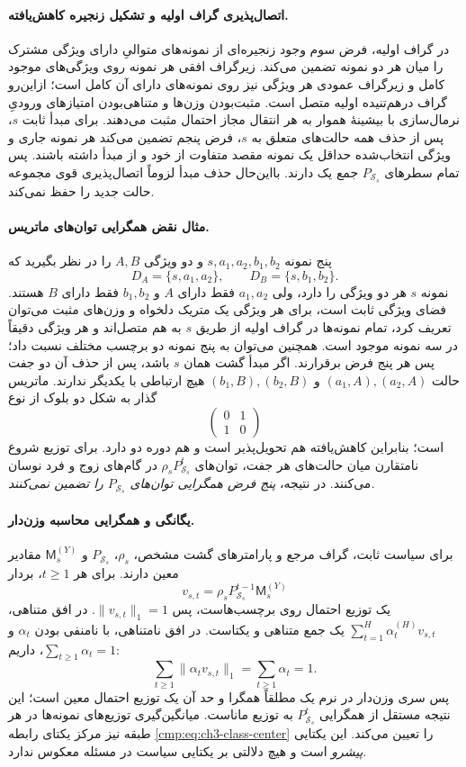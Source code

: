 \paragraph{اتصال‌پذیری گراف اولیه و تشکیل زنجیره کاهش‌یافته.}
در گراف اولیه، فرض سوم
وجود زنجیره‌ای از نمونه‌های
متوالیِ دارای ویژگی مشترک
را میان هر دو نمونه
تضمین می‌کند. زیرگراف
افقی هر نمونه روی
ویژگی‌های موجود کامل
و زیرگراف عمودی هر
ویژگی نیز روی
نمونه‌های دارای آن
کامل است؛ ازاین‌رو
گراف درهم‌تنیده اولیه
متصل است. مثبت‌بودن
وزن‌ها و متناهی‌بودن امتیازهای ورودیِ نرمال‌سازی با بیشینهٔ هموار
به هر انتقال مجاز
احتمال مثبت می‌دهند.
برای مبدأ ثابت $s$،
پس از حذف همه حالت‌های
متعلق به $s$،
فرض پنجم تضمین می‌کند
هر نمونه جاری و
ویژگی انتخاب‌شده
حداقل یک نمونه مقصد
متفاوت از خود و
از مبدأ داشته باشند.
پس تمام سطرهای
$P_{\mathcal S_s}$ جمع یک دارند.
بااین‌حال حذف مبدأ
لزوماً اتصال‌پذیری
قوی مجموعه حالت
جدید را حفظ نمی‌کند.

\paragraph{مثال نقض همگرایی توان‌های ماتریس.}
پنج نمونه $s,a_1,a_2,b_1,b_2$
و دو ویژگی $A,B$
را در نظر بگیرید که
\[
D_A=\{s,a_1,a_2\},
\qquad
D_B=\{s,b_1,b_2\}.
\]
نمونه $s$ هر دو ویژگی
را دارد، ولی $a_1,a_2$
فقط دارای $A$ و
$b_1,b_2$ فقط دارای
$B$ هستند. فضای
ویژگی ثابت است،
برای هر ویژگی
یک متریک دلخواه
و وزن‌های مثبت
می‌توان تعریف کرد،
تمام نمونه‌ها
در گراف اولیه
از طریق $s$
به هم متصل‌اند
و هر ویژگی دقیقاً
در سه نمونه موجود
است. همچنین
می‌توان به پنج
نمونه دو برچسب
مختلف نسبت داد؛
پس هر پنج فرض
برقرارند.
اگر مبدأ گشت
همان $s$ باشد،
پس از حذف آن
دو جفت حالت
$(a_1,A),(a_2,A)$
و $(b_1,B),(b_2,B)$
هیچ ارتباطی با
یکدیگر ندارند.
ماتریس گذار
به شکل دو بلوک
از نوع
\[
\begin{pmatrix}
0&1\\
1&0
\end{pmatrix}
\]
است؛ بنابراین
کاهش‌یافته
هم تحویل‌پذیر است
و هم دوره دو دارد.
برای توزیع شروع
نامتقارن میان
حالت‌های هر جفت،
توان‌های
$\rho_sP_{\mathcal S_s}^t$
در گام‌های زوج
و فرد نوسان می‌کنند.
در نتیجه،
\emph{پنج فرض
همگرایی توان‌های
$P_{\mathcal S_s}$ را
تضمین نمی‌کنند.}

\paragraph{یگانگی و همگرایی محاسبه وزن‌دار.}
برای سیاست ثابت،
گراف مرجع و
پارامترهای گشت
مشخص، $\rho_s$،
$P_{\mathcal S_s}$ و
$\mathsf M_s^{(Y)}$
مقادیر معین دارند.
برای هر $t\ge1$،
بردار
\[
v_{s,t}
=\rho_sP_{\mathcal S_s}^{t-1}
\mathsf M_s^{(Y)}
\]
یک توزیع احتمال
روی برچسب‌هاست،
پس $\|v_{s,t}\|_1=1$.
در افق متناهی،
$\sum_{t=1}^{H}
\alpha_t^{(H)}v_{s,t}$
یک جمع متناهی
و یکتاست.
در افق نامتناهی،
با نامنفی بودن
$\alpha_t$ و
$\sum_{t\ge1}\alpha_t=1$،
داریم:
\[
\sum_{t\ge1}
\|\alpha_tv_{s,t}\|_1
=\sum_{t\ge1}\alpha_t=1.
\]
پس سری وزن‌دار
در نرم یک مطلقاً
همگرا و حد آن
یک توزیع احتمال
معین است؛ این
نتیجه مستقل از
همگرایی
$P_{\mathcal S_s}^t$
به توزیع ماناست.
میانگین‌گیری
توزیع‌های نمونه‌ها
در هر طبقه نیز
مرکز یکتای
رابطه
\eqref{cmp:eq:ch3-class-center}
را تعیین می‌کند.
این یکتایی
\emph{پیشرو} است
و هیچ دلالتی
بر یکتایی
سیاست در مسئله
معکوس ندارد.



